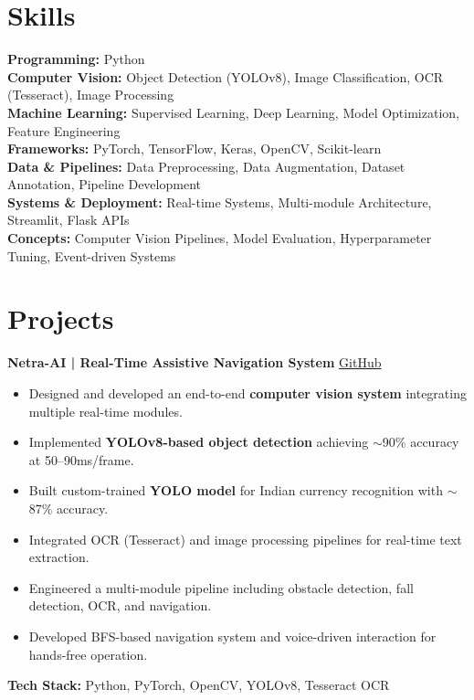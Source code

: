 \documentclass[10.5pt]{article}
\begin{document}
\section*{Skills}
\textbf{Programming:} Python \\
\textbf{Computer Vision:} Object Detection (YOLOv8), Image Classification, OCR (Tesseract), Image Processing \\
\textbf{Machine Learning:} Supervised Learning, Deep Learning, Model Optimization, Feature Engineering \\
\textbf{Frameworks:} PyTorch, TensorFlow, Keras, OpenCV, Scikit-learn \\
\textbf{Data \& Pipelines:} Data Preprocessing, Data Augmentation, Dataset Annotation, Pipeline Development \\
\textbf{Systems \& Deployment:} Real-time Systems, Multi-module Architecture, Streamlit, Flask APIs \\
\textbf{Concepts:} Computer Vision Pipelines, Model Evaluation, Hyperparameter Tuning, Event-driven Systems

\section*{Projects}

\textbf{Netra-AI | Real-Time Assistive Navigation System} \hfill
\href{https://github.com/anushkaaa26/NetraAI}{GitHub} \\
\begin{itemize}
    \item Designed and developed an end-to-end \textbf{computer vision system} integrating multiple real-time modules.
    \item Implemented \textbf{YOLOv8-based object detection} achieving $\sim$90\% accuracy at 50--90ms/frame.
    \item Built custom-trained \textbf{YOLO model} for Indian currency recognition with $\sim$87\% accuracy.
    \item Integrated OCR (Tesseract) and image processing pipelines for real-time text extraction.
    \item Engineered a multi-module pipeline including obstacle detection, fall detection, OCR, and navigation.
    \item Developed BFS-based navigation system and voice-driven interaction for hands-free operation.
\end{itemize}
\textbf{Tech Stack:} Python, PyTorch, OpenCV, YOLOv8, Tesseract OCR
\end{document}
